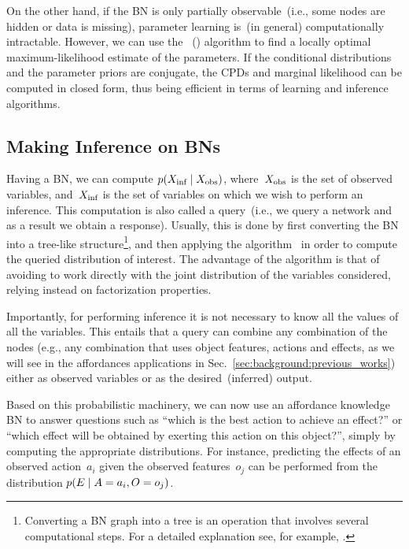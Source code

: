 On the other hand, if the \ac{BN} is only partially observable~(i.e., some nodes are hidden or data is missing), parameter learning is~(in general) computationally intractable.
However, we can use the \EMlong~(\EM) algorithm to find a locally optimal maximum-likelihood estimate of the parameters.
If the conditional distributions and the parameter priors are conjugate, the \acp{CPD} and marginal likelihood can be computed in closed form, thus being efficient in terms of learning and inference algorithms.

\subsection{Making Inference on \aclp{BN}}
\label{sec:background:theory:inference}

Having a \ac{BN}, we can compute $p(X_\text{inf} \mid X_\text{obs})$, where~$X_\text{obs}$ is the set of observed variables, and~$X_\text{inf}$ is the set of variables on which we wish to perform an inference.
This computation is also called a query~(i.e., we query a network and as a result we obtain a response).
Usually, this is done by first converting the \ac{BN} into a tree-like structure\footnote{%
Converting a \ac{BN} graph into a tree is an operation that involves several computational steps.
For a detailed explanation see, for example, \cite[p.~416]{bishop:prml}.}, %
and then applying the \emph{\jtree{}} algorithm~\cite{lauritzen:1988:jtree,huang:1996:jtree,bishop:prml} in order to compute the queried distribution of interest.
The advantage of the \jtree{} algorithm is that of avoiding to work directly with the joint distribution of the variables considered, relying instead on factorization properties.

Importantly, for performing inference it is not necessary to know all the values of all the variables.
This entails that a query can combine any combination of the nodes (e.g., any combination that uses object features, actions and effects, as we will see in the affordances applications in Sec.~\ref{sec:background:previous_works}) either as observed variables or as the desired~(inferred) output.

Based on this probabilistic machinery, we can now use an affordance knowledge \ac{BN} to answer questions such as ``which is the best action to achieve an effect?'' or ``which effect will be obtained by exerting this action on this object?'', simply by computing the appropriate distributions.
For instance, predicting the effects of an observed action~$a_i$ given the observed features~$o_j$ can be performed from the distribution $p(E \mid A=a_i, O=o_j)$.

